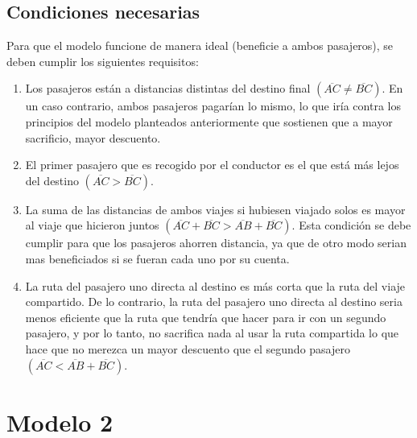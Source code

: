 \documentclass[12pt]{report}
\begin{document}

\newpage
\subsection*{Condiciones necesarias}
Para que el modelo funcione de manera ideal (beneficie a ambos pasajeros), se deben cumplir los siguientes requisitos:

\begin{enumerate}
    \item Los pasajeros están a distancias distintas del destino final $(\overline{AC} \neq \overline{BC})$. En un caso contrario, ambos pasajeros pagarían lo mismo, lo que iría contra los principios del modelo planteados anteriormente que sostienen que a mayor sacrificio, mayor descuento.
    \item El primer pasajero que es recogido por el conductor es el que está más lejos del destino $(\overline{AC} > \overline{BC})$.
    \item La suma de las distancias de ambos viajes si hubiesen viajado solos es mayor al viaje que hicieron juntos $(\overline{AC} + \overline{BC} > \overline{AB} + \overline{BC})$. Esta condición se debe cumplir para que los pasajeros ahorren distancia, ya que de otro modo serian mas beneficiados si se fueran cada uno por su cuenta.
    \item La ruta del pasajero uno directa al destino es más corta que la ruta del viaje compartido. De lo contrario, la ruta del pasajero uno directa al destino seria menos eficiente que la ruta que tendría que hacer para ir con un segundo pasajero, y por lo tanto, no sacrifica nada al usar la ruta compartida lo que hace que no merezca un mayor descuento que el segundo pasajero $(\overline{AC} < \overline{AB} + \overline{BC})$.
\end{enumerate}



\section*{Modelo 2}
\end{document}
